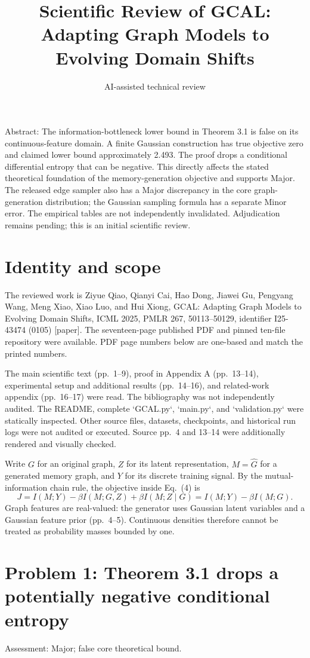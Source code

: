 \documentclass[10pt]{article}
\title{Scientific Review of
GCAL: Adapting Graph Models to Evolving Domain Shifts}
\author{AI-assisted technical review}
\date{}
\begin{document}
\maketitle
Abstract: The information-bottleneck lower bound in Theorem 3.1 is false on its continuous-feature domain. A finite Gaussian construction has true objective zero and claimed lower bound approximately 2.493. The proof drops a conditional differential entropy that can be negative. This directly affects the stated theoretical foundation of the memory-generation objective and supports Major. The released edge sampler also has a Major discrepancy in the core graph-generation distribution; the Gaussian sampling formula has a separate Minor error. The empirical tables are not independently invalidated. Adjudication remains pending; this is an initial scientific review.\par
\section*{Identity and scope}
The reviewed work is Ziyue Qiao, Qianyi Cai, Hao Dong, Jiawei Gu, Pengyang Wang, Meng Xiao, Xiao Luo, and Hui Xiong, GCAL: Adapting Graph Models to Evolving Domain Shifts, ICML 2025, PMLR 267, 50113–50129, identifier I25-43474 (0105) [paper]. The seventeen-page published PDF and pinned ten-file repository were available. PDF page numbers below are one-based and match the printed numbers.\par
The main scientific text (pp. 1–9), proof in Appendix A (pp. 13–14), experimental setup and additional results (pp. 14–16), and related-work appendix (pp. 16–17) were read. The bibliography was not independently audited. The README, complete `GCAL.py`, `main.py`, and `validation.py` were statically inspected. Other source files, datasets, checkpoints, and historical run logs were not audited or executed. Source pp. 4 and 13–14 were additionally rendered and visually checked.\par
Write \(G\) for an original graph, \(Z\) for its latent representation, \(M=\widehat G\) for a generated memory graph, and \(Y\) for its discrete training signal. By the mutual-information chain rule, the objective inside Eq. (4) is \[J=I(M;Y)-\beta I(M;G,Z)+\beta I(M;Z\mid G)
 =I(M;Y)-\beta I(M;G).\] Graph features are real-valued: the generator uses Gaussian latent variables and a Gaussian feature prior (pp. 4–5). Continuous densities therefore cannot be treated as probability masses bounded by one.\par
\section*{Problem 1: Theorem 3.1 drops a potentially negative conditional entropy}
Assessment: Major; false core theoretical bound.\par
\end{document}
